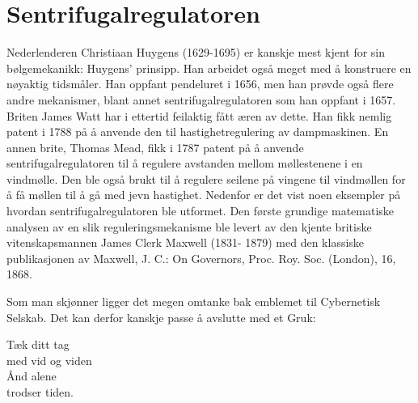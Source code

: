 \documentclass[../../main.tex]{subfiles}
\begin{document}
\section{Sentrifugalregulatoren}

Nederlenderen Christiaan Huygens (1629-1695) er kanskje mest kjent for sin bølgemekanikk: Huygens' prinsipp. Han arbeidet også meget med å konstruere en nøyaktig tidsmåler. Han oppfant pendeluret i 1656, men han prøvde også flere andre mekanismer, blant annet sentrifugalregulatoren som han oppfant i 1657. Briten James Watt har i ettertid feilaktig fått æren av dette. Han fikk nemlig patent i 1788 på å anvende den til hastighetregulering av dampmaskinen. En annen brite, Thomas Mead, fikk i 1787 patent på å anvende sentrifugalregulatoren til å regulere avstanden mellom møllestenene i en vindmølle. Den ble også brukt til å regulere seilene på vingene til vindmøllen for å få møllen til å gå med jevn hastighet. Nedenfor er det vist noen eksempler på hvordan sentrifugalregulatoren ble utformet. Den første grundige matematiske analysen av en slik reguleringsmekanisme ble levert av den kjente britiske vitenskapsmannen James Clerk Maxwell (1831- 1879) med den klassiske publikasjonen av Maxwell, J. C.: On Governors, Proc. Roy. Soc. (London), 16, 1868.


Som man skjønner ligger det megen omtanke bak emblemet til Cybernetisk Selskab. Det kan derfor kanskje passe å avslutte med et Gruk:

\begin{center}
Tæk ditt tag\\
med vid og viden\\
Ånd alene\\
trodser tiden.
\end{center}
\end{document}

